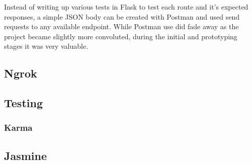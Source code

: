 Instead of writing up various tests in Flask to test each route and it's expected responses, a simple JSON body can be created with Postman and used send requests to any available endpoint. While Postman use did fade away as the project became slightly more convoluted, during the initial and prototyping stages it was very valuable.

\subsection{Ngrok}

\subsection{Testing}
\subsubsection{Karma}
\subsection{Jasmine}
